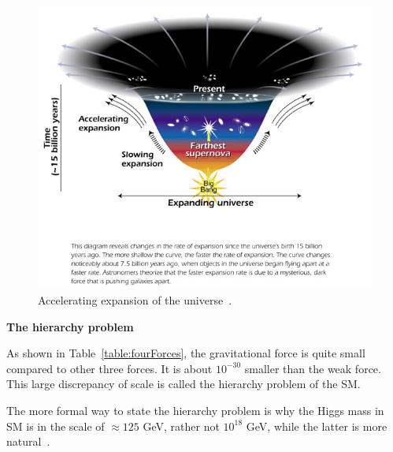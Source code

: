 \begin{figure}
\centering
\includegraphics[width=.8\textwidth]{figures/accelerating_universe.jpg}
\caption{Accelerating expansion of the universe~\cite{web:nasa}.}
\label{fig:universe}
\end{figure}  



{\bf The hierarchy problem}

As shown in Table~\ref{table:fourForces}, the gravitational force is quite small compared 
to other three forces. It is about $10^{-30}$ smaller than the weak force. 
This large discrepancy of scale is called the 
hierarchy problem of the SM. 

The more formal way to state the hierarchy problem is why the Higgs mass in SM is in the scale of
${\approx}125$ GeV, 
rather not $10^{18}$ GeV, while the latter is more natural~\cite{wb:hierarchy}. 

